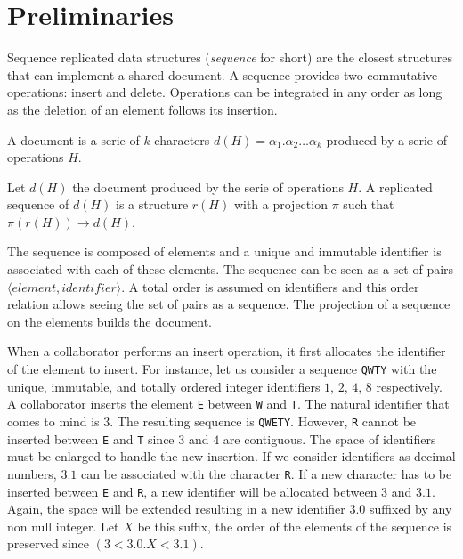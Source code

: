 
\section{Preliminaries}
\label{sec:preliminaries}

Sequence replicated data structures (\emph{sequence} for short) are the closest
structures that can implement a shared document. A sequence provides two
commutative operations: insert and delete. Operations can be integrated in any
order as long as the deletion of an element follows its insertion.


\begin{definition}[Document]
  A document is a serie of $k$ characters
  $d(H) = \alpha_1.\alpha_2\ldots \alpha_k$ produced by a serie of operations
  $H$.
\end{definition}

\begin{definition}
  Let $d(H)$ the document produced by the serie of operations $H$. A replicated
  sequence of $d(H)$ is a structure $r(H)$ with a projection $\pi$ such that
  $\pi(r(H)) \rightarrow d(H)$.
\end{definition}

The sequence is composed of elements and a unique and immutable identifier is
associated with each of these elements. The sequence can be seen as a set of
pairs $\langle element, identifier \rangle$. A total order is assumed on
identifiers and this order relation allows seeing the set of pairs as a
sequence. The projection of a sequence on the elements builds the document.

When a collaborator performs an insert operation, it first allocates the
identifier of the element to insert. For instance, let us consider a sequence
\texttt{QWTY} with the unique, immutable, and totally ordered integer
identifiers $1$, $2$, $4$, $8$ respectively. A collaborator inserts the element
\texttt{E} between \texttt{W} and \texttt{T}. The natural identifier that comes
to mind is $3$. The resulting sequence is \texttt{QWETY}. However, \texttt{R}
cannot be inserted between \texttt{E} and \texttt{T} since $3$ and $4$ are
contiguous. The space of identifiers must be enlarged to handle the new
insertion. If we consider identifiers as decimal numbers, $3.1$ can be
associated with the character \texttt{R}. If a new character has to be inserted
between \texttt{E} and \texttt{R}, a new identifier will be allocated between
$3$ and $3.1$. Again, the space will be extended resulting in a new identifier
$3.0$ suffixed by any non null integer. Let $X$ be this suffix, the order of the
elements of the sequence is preserved since $(3 < 3.0.X < 3.1)$.

